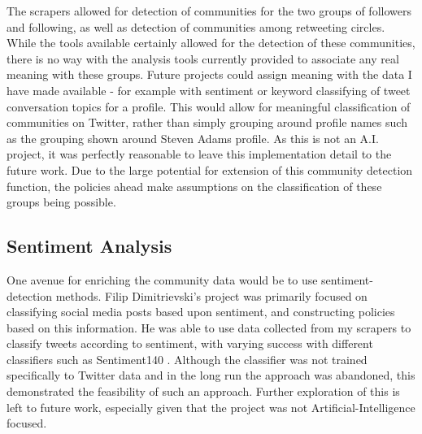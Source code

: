 The scrapers allowed for detection of communities for the two groups of followers and following, as well as detection of communities among retweeting circles. While the tools available certainly allowed for the detection of these communities, there is no way with the analysis tools currently provided to associate any real meaning with these groups. Future projects could assign meaning with the data I have made available - for example with sentiment or keyword classifying of tweet conversation topics for a profile. This would allow for meaningful classification of communities on Twitter, rather than simply grouping around profile names such as the grouping shown around Steven Adams profile. As this is not an A.I. project, it was perfectly reasonable to leave this implementation detail to the future work. Due to the large potential for extension of this community detection function, the policies ahead make assumptions on the classification of these groups being possible. 





\subsection{Sentiment Analysis}

One avenue for enriching the community data would be to use sentiment-detection methods. Filip Dimitrievski's project was primarily focused on classifying social media posts based upon sentiment, and constructing policies based on this information. He was able to use data collected from my scrapers to classify tweets according to sentiment, with varying success with different classifiers such as Sentiment140 \cite{}. Although the classifier was not trained specifically to Twitter data and in the long run the approach was abandoned, this demonstrated the feasibility of such an approach. Further exploration of this is left to future work, especially given that the project was not Artificial-Intelligence focused.

